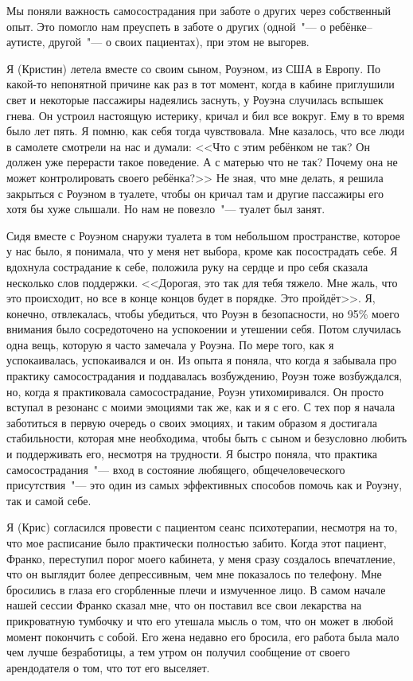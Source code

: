 Мы поняли важность самосострадания при заботе о других через собственный опыт. Это помогло нам преуспеть в заботе о других (одной~"--- о ребёнке--аутисте, другой~"--- о своих пациентах), при этом не выгорев.

Я (Кристин) летела вместе со своим сыном, Роуэном, из США в Европу. По какой-то непонятной причине как раз в тот момент, когда в кабине приглушили свет и некоторые пассажиры надеялись заснуть, у Роуэна случилась вспышек гнева. Он устроил настоящую истерику, кричал и бил все вокруг. Ему в то время было лет пять. Я помню, как себя тогда чувствовала. Мне казалось, что все люди в самолете смотрели на нас и думали: <<Что с этим ребёнком не так? Он должен уже перерасти такое поведение. А с матерью что не так? Почему она не может контролировать своего ребёнка?>> Не зная, что мне делать, я решила закрыться с Роуэном в туалете, чтобы он кричал там и другие пассажиры его хотя бы хуже слышали. Но нам не повезло~"--- туалет был занят. 

Сидя вместе с Роуэном снаружи туалета в том небольшом пространстве, которое у нас было, я понимала, что у меня нет выбора, кроме как посострадать себе. Я вдохнула сострадание к себе, положила руку на сердце и про себя сказала несколько слов поддержки. <<Дорогая, это так для тебя тяжело. Мне жаль, что это происходит, но все в конце концов будет в порядке. Это пройдёт>>. Я, конечно, отвлекалась, чтобы убедиться, что Роуэн в безопасности, но 95\% моего внимания было сосредоточено на успокоении и утешении себя. Потом случилась одна вещь, которую я часто замечала у Роуэна. По мере того, как я успокаивалась, успокаивался и он. Из опыта я поняла, что когда я забывала про практику самосострадания и поддавалась возбуждению, Роуэн тоже возбуждался, но, когда я практиковала самосострадание, Роуэн утихомиривался. Он просто вступал в резонанс с моими эмоциями так же, как и я с его. С тех пор я начала заботиться в первую очередь о своих эмоциях, и таким образом я достигала стабильности, которая мне необходима, чтобы быть с сыном и безусловно любить и поддерживать его, несмотря на трудности. Я быстро поняла, что практика самосострадания~"--- вход в состояние любящего, общечеловеческого присутствия~"--- это один из самых эффективных способов помочь как и Роуэну, так и самой себе.

Я (Крис) согласился провести с пациентом сеанс психотерапии, несмотря на то, что мое расписание было практически полностью забито. Когда этот пациент, Франко, переступил порог моего кабинета, у меня сразу создалось впечатление, что он выглядит более депрессивным, чем мне показалось по телефону. Мне бросились в глаза его сгорбленные плечи и измученное лицо. В самом начале нашей сессии Франко сказал мне, что он поставил все свои лекарства на прикроватную тумбочку и что его утешала мысль о том, что он может в любой момент покончить с собой. Его жена недавно его бросила, его работа была мало чем лучше безработицы, а тем утром он получил сообщение от своего арендодателя о том, что тот его выселяет.

